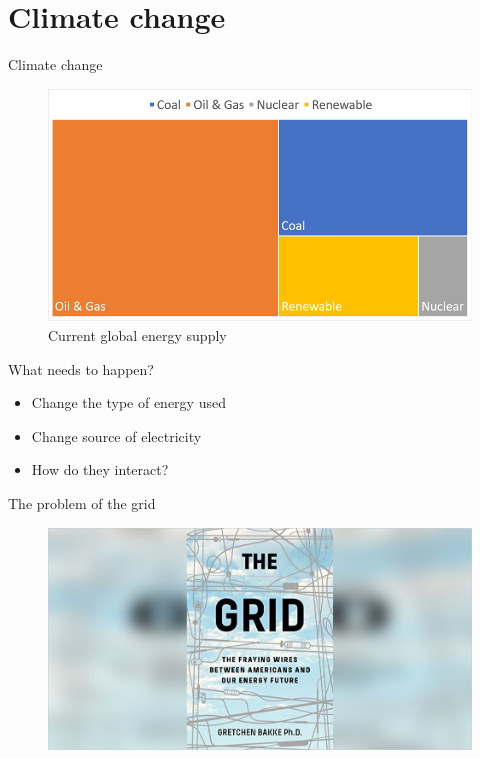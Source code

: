 \documentclass{beamer}
\begin{document}
\section{Climate change}

\begin{frame}{Climate change}
\begin{figure}
    \centering
    \includegraphics[width=\textwidth]{../img/energy.png}
    \caption{Current global energy supply}
\end{figure}
\end{frame}{}

\begin{frame}{What needs to happen?}
\begin{itemize}
    \item Change the type of energy used \pause
    \item Change source of electricity \pause %
    \item How do they interact? %
\end{itemize}{}
\end{frame}{}

\begin{frame}{The problem of the grid}
\begin{figure}[htpb]
	\centering
	\includegraphics[width=0.8\linewidth]{../img/grid.jpeg}
\end{figure}
\end{frame}
\end{document}
